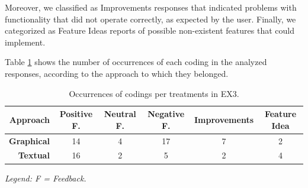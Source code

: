 Moreover, we classified as Improvements responses that indicated problems with functionality that did not operate correctly, as expected by the user.
Finally, we categorized as Feature Ideas reports of possible non-existent features that could implement.

Table \ref{tab:QAnubis} shows the number of occurrences of each coding in the analyzed responses, according to the approach to which they belonged.

\begin{table}[!htb]
 \caption{Occurrences of codings per treatments in EX3.}
    \label{tab:QAnubis}
\scriptsize
\centering
\begin{tabular}{rccccc}
\bottomrule
\rowcolor[HTML]{C0C0C0}
\textbf{Approach} & \textbf{Positive F.} & \textbf{Neutral F.} & \textbf{Negative F.} & \textbf{Improvements} & \textbf{Feature Idea} \\ \hline
\textbf{Graphical} & 14 & 4 & 17 & 7 & 2 \\
\textbf{Textual} & 16 & 2 & 5 & 2 & 4 \\ \toprule
\end{tabular}
\begin{tablenotes}
    \scriptsize
    \centering
    \item \textit{Legend: F = Feedback.}
\end{tablenotes}
\end{table}

